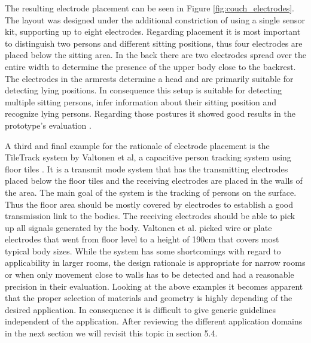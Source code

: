 The resulting electrode placement can be seen in Figure \ref{fig:couch_electrodes}. The layout was designed under the additional constriction of using a single sensor kit, supporting up to eight electrodes. Regarding placement it is most important to distinguish two persons and different sitting positions, thus four electrodes are placed below the sitting area. In the back there are two electrodes spread over the entire width to determine the presence of the upper body close to the backrest. The electrodes in the armrests determine a head and are primarily suitable for detecting lying positions. In consequence this setup is suitable for detecting multiple sitting persons, infer information about their sitting position and recognize lying persons. Regarding those postures it showed good results in the prototype's evaluation \cite{Couch2011}.
 
A third and final example for the rationale of electrode placement is the TileTrack system by Valtonen et al, a capacitive person tracking system using floor tiles \cite{Valtonen2009a}. It is a transmit mode system that has the transmitting electrodes placed below the floor tiles and the receiving electrodes are placed in the walls of the area. The main goal of the system is the tracking of persons on the surface. Thus the floor area should be mostly covered by electrodes to establish a good transmission link to the bodies. The receiving electrodes should be able to pick up all signals generated by the body. Valtonen et al. picked wire or plate electrodes that went from floor level to a height of 190cm that covers most typical body sizes. While the system has some shortcomings with regard to applicability in larger rooms, the design rationale is appropriate for narrow rooms or when only movement close to walls has to be detected and had a reasonable precision in their evaluation.
Looking at the above examples it becomes apparent that the proper selection of materials and geometry is highly depending of the desired application. In consequence it is difficult to give generic guidelines independent of the application. After reviewing the different application domains in the next section we will revisit this topic in section 5.4.

